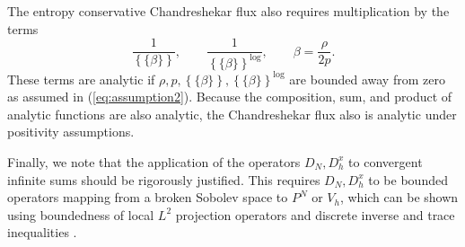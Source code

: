 \documentclass[preprint,10pt]{elsarticle}
\theoremstyle{definition}
\theoremstyle{lemma}
\theoremstyle{theorem}
\theoremstyle{assumption}
\newcommand{\LRc}[1]{\left\{ #1 \right\}}
\newcommand{\avg}[1] {\ensuremath{\LRc{\!\{#1\}\!}}}
\begin{document}
The entropy conservative Chandreshekar flux also requires multiplication by the terms
\[
\frac{1}{\avg{\beta}}, \qquad \frac{1}{\avg{\beta}^{\log}}, \qquad \beta = \frac{\rho}{2p}.
\]
These terms are analytic if $\rho, p, \avg{\beta}, \avg{\beta}^{\log}$ are bounded away from zero as assumed in (\ref{eq:assumption2}).  Because the composition, sum, and product of analytic functions are also analytic, the Chandreshekar flux also is analytic under positivity assumptions.  

Finally, we note that the application of the operators $D_N, D^x_h$ to convergent infinite sums should be rigorously justified.  
This requires $D_N, D^x_h$ to be bounded operators mapping from a broken Sobolev space to $P^N$ or $V_h$, which can be shown using boundedness of local $L^2$ projection operators and discrete inverse and trace inequalities \cite{chan2015gpu}.   



\end{document}
